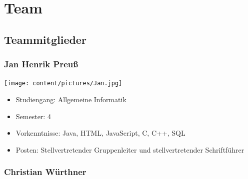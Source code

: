 \chapter{Team}

\section{Teammitglieder}

\subsection{Jan Henrik Preuß}

\begin{minipage}{0.28\textwidth} 
\texttt{[image: content/pictures/Jan.jpg]}
\end{minipage}%
\begin{minipage}{0.7\textwidth}
\begin{itemize}
   \item Studiengang: Allgemeine Informatik
  \item Semester: 4
  \item Vorkenntnisse: Java, HTML, JavaScript, C, C++, SQL
  \item Posten: Stellvertretender Gruppenleiter und stellvertretender Schriftführer
\end{itemize}
\end{minipage}

\subsection{Christian Würthner}


